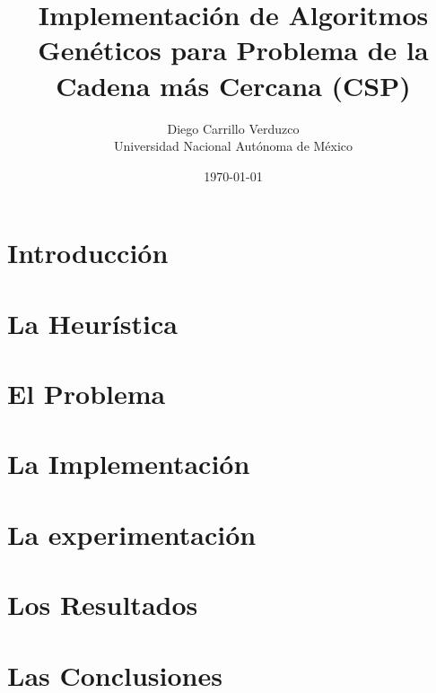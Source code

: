 \documentclass{article}
\title{Implementación de Algoritmos Genéticos para Problema de la Cadena más Cercana (CSP)}
\author{
  Diego Carrillo Verduzco \\
  Universidad Nacional Autónoma de México
}
\date{\today}
\begin{document}
\maketitle
\section{Introducción}
\section{La Heurística}
\section{El Problema}
\section{La Implementación}
\section{La experimentación}
\section{Los Resultados}
\section{Las Conclusiones}
\end{document}
